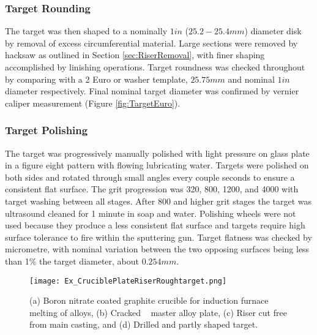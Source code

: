 \documentclass[a4paper,12pt,oneside]{report}%
\begin{document}
\subsubsection{Target Rounding}
The target was then shaped to a nominally $1 in$ ($25.2 - 25.4 mm$) diameter disk by removal of excess circumferential material. Large sections were removed by hacksaw as outlined in Section \ref{sec:RiserRemoval}, with finer shaping accomplished by linishing operations. Target roundness was checked throughout by comparing with a 2 Euro or washer template, $25.75 mm$ and nominal $1 in$ diameter respectively. Final nominal target diameter was confirmed by vernier caliper measurement (Figure \ref{fig:TargetEuro}).  

\subsubsection{Target Polishing}
The target was progressively manually polished with light pressure on glass plate in a figure eight pattern with flowing lubricating water. Targets were polished on both sides and rotated through small angles every couple seconds to ensure a consistent flat surface. The grit progression was 320, 800, 1200, and 4000 with target washing between all stages. After 800 and higher grit stages the target was ultrasound cleaned for 1 minute in soap and water. Polishing wheels were not used because they produce a less consistent flat surface and targets require high surface tolerance to fire within the sputtering gun. Target flatness was checked by micrometre, with nominal variation between the two opposing surfaces being less than 1\% the target diameter, about $0.254 mm$. 

\begin{figure}[htbp]
	\centering
	\texttt{[image: Ex\_CruciblePlateRiserRoughtarget.png]}
	\caption{(a) Boron nitrate coated graphite crucible for induction furnace melting of alloys, (b) Cracked \MgZnCa~ master alloy plate, (c) Riser cut free from main casting, and (d) Drilled and partly shaped target.}
	\label{fig:CrucibleShaping}
\end{figure}
\end{document}
